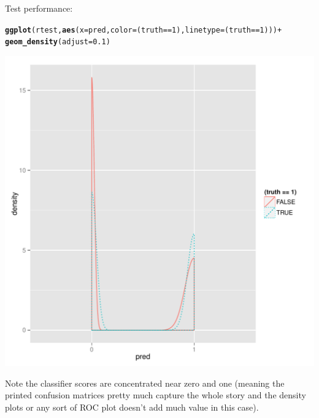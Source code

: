 \documentclass{article}\usepackage[]{graphicx}\usepackage[]{color}
\makeatletter
\def\maxwidth{ %
  \ifdim\Gin@nat@width>\linewidth
    \linewidth
  \else
    \Gin@nat@width
  \fi
}
\newcommand{\hlnum}[1]{\textcolor[rgb]{0.686,0.059,0.569}{#1}}%
\newcommand{\hlopt}[1]{\textcolor[rgb]{0,0,0}{#1}}%
\newcommand{\hlstd}[1]{\textcolor[rgb]{0.345,0.345,0.345}{#1}}%
\newcommand{\hlkwc}[1]{\textcolor[rgb]{0.333,0.667,0.333}{#1}}%
\newcommand{\hlkwd}[1]{\textcolor[rgb]{0.737,0.353,0.396}{\textbf{#1}}}%
\newenvironment{kframe}{%
 \def\at@end@of@kframe{}%
 \ifinner\ifhmode%
  \def\at@end@of@kframe{\end{minipage}}%
  \begin{minipage}{\columnwidth}%
 \fi\fi%
 \def\FrameCommand##1{\hskip\@totalleftmargin \hskip-\fboxsep
 \colorbox{shadecolor}{##1}\hskip-\fboxsep
     \hskip-\linewidth \hskip-\@totalleftmargin \hskip\columnwidth}%
 \MakeFramed {\advance\hsize-\width
   \@totalleftmargin\z@ \linewidth\hsize
   \@setminipage}}%
 {\par\unskip\endMakeFramed%
 \at@end@of@kframe}
\newenvironment{knitrout}{}{} %
\makeatother
\begin{document}
Test performance:
\begin{knitrout}
\color{fgcolor}\begin{kframe}
\begin{alltt}
\hlkwd{ggplot}\hlstd{(rtest,} \hlkwd{aes}\hlstd{(}\hlkwc{x}\hlstd{=pred,} \hlkwc{color}\hlstd{=(truth}\hlopt{==}\hlnum{1}\hlstd{),}\hlkwc{linetype}\hlstd{=(truth}\hlopt{==}\hlnum{1}\hlstd{)))} \hlopt{+}
   \hlkwd{geom_density}\hlstd{(}\hlkwc{adjust}\hlstd{=}\hlnum{0.1}\hlstd{)}
\end{alltt}
\end{kframe}
\includegraphics[width=\maxwidth]{figure/plottest} 

\end{knitrout}


Note the classifier scores are concentrated near zero and one
(meaning the printed confusion matrices pretty much capture the whole
story and the density plots or any sort of ROC plot doesn't add much
value in this case).
\end{document}
